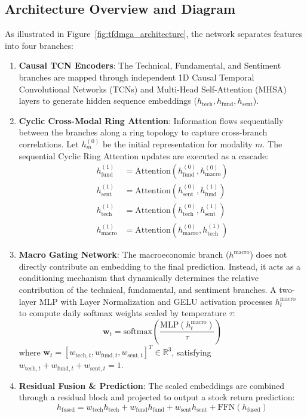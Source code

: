 \documentclass[11pt]{article}
\begin{document}
\subsection{Architecture Overview and Diagram}
As illustrated in Figure~\ref{fig:tfdmga_architecture}, the network separates features into four branches:
\begin{enumerate}
    \item \textbf{Causal TCN Encoders}: The Technical, Fundamental, and Sentiment branches are mapped through independent 1D Causal Temporal Convolutional Networks (TCNs) and Multi-Head Self-Attention (MHSA) layers to generate hidden sequence embeddings ($h_{\text{tech}}, h_{\text{fund}}, h_{\text{sent}}$).
    \item \textbf{Cyclic Cross-Modal Ring Attention}: Information flows sequentially between the branches along a ring topology to capture cross-branch correlations. Let $h_m^{(0)}$ be the initial representation for modality $m$. The sequential Cyclic Ring Attention updates are executed as a cascade:
    \begin{align}
        h_{\text{fund}}^{(1)} &= \text{Attention}(h_{\text{fund}}^{(0)}, h_{\text{macro}}^{(0)}) \\
        h_{\text{sent}}^{(1)} &= \text{Attention}(h_{\text{sent}}^{(0)}, h_{\text{fund}}^{(1)}) \\
        h_{\text{tech}}^{(1)} &= \text{Attention}(h_{\text{tech}}^{(0)}, h_{\text{sent}}^{(1)}) \\
        h_{\text{macro}}^{(1)} &= \text{Attention}(h_{\text{macro}}^{(0)}, h_{\text{tech}}^{(1)})
    \end{align}
    \item \textbf{Macro Gating Network}: The macroeconomic branch ($h^{\text{macro}}$) does not directly contribute an embedding to the final prediction. Instead, it acts as a conditioning mechanism that dynamically determines the relative contribution of the technical, fundamental, and sentiment branches. A two-layer MLP with Layer Normalization and GELU activation processes $h_t^{\text{macro}}$ to compute daily softmax weights scaled by temperature $\tau$:
    \begin{equation}
        \mathbf{w}_t = \text{softmax}\left( \frac{\text{MLP}(h_t^{\text{macro}})}{\tau} \right)
    \end{equation}
    where $\mathbf{w}_t = [w_{\text{tech},t}, w_{\text{fund},t}, w_{\text{sent},t}]^T \in \mathbb{R}^3$, satisfying $w_{\text{tech},t} + w_{\text{fund},t} + w_{\text{sent},t} = 1$.
    \item \textbf{Residual Fusion \& Prediction}: The scaled embeddings are combined through a residual block and projected to output a stock return prediction:
    \begin{equation}
        h_{\text{fused}} = w_{\text{tech}} h_{\text{tech}} + w_{\text{fund}} h_{\text{fund}} + w_{\text{sent}} h_{\text{sent}} + \text{FFN}(h_{\text{fused}})
    \end{equation}
\end{enumerate}
\end{document}
